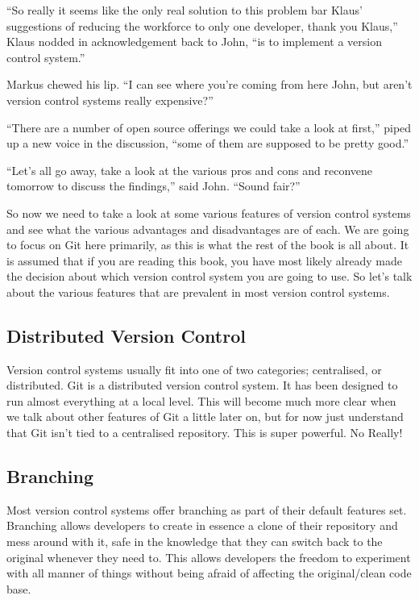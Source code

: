 \begin{trenches}
``So really it seems like the only real solution to this problem bar Klaus' suggestions of reducing the workforce to only one developer, thank you Klaus,'' Klaus nodded in acknowledgement back to John, ``is to implement a version control system.''

Markus chewed his lip.  ``I can see where you're coming from here John, but aren't version control systems really expensive?''

``There are a number of open source offerings we could take a look at first,'' piped up a new voice in the discussion, ``some of them are supposed to be pretty good.''

``Let's all go away, take a look at the various pros and cons and reconvene tomorrow to discuss the findings,'' said John.  ``Sound fair?''
\end{trenches}

So now we need to take a look at some various features of version control systems and see what the various advantages and disadvantages are of each.  We are going to focus on Git here primarily, as this is what the rest of the book is all about.  It is assumed that if you are reading this book, you have most likely already made the decision about which version control system you are going to use.  So let's talk about the various features that are prevalent in most version control systems.

\subsection{Distributed Version Control}

Version control systems usually fit into one of two categories; centralised, or distributed.  Git is a distributed version control system.  It has been designed to run almost everything at a local level.  This will become much more clear when we talk about other features of Git a little later on, but for now just understand that Git isn't tied to a centralised repository.  This is super powerful.  No Really!

\subsection{Branching}

Most version control systems offer branching as part of their default features set.  Branching allows developers to create in essence a clone of their repository and mess around with it, safe in the knowledge that they can switch back to the original whenever they need to.  This allows developers the freedom to experiment with all manner of things without being afraid of affecting the original/clean code base.

